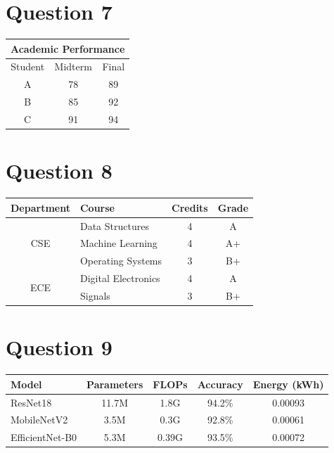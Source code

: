 \documentclass[12pt,a4paper]{article}
\begin{document}
	\section*{Question 7}
	
	\begin{center}
		\begin{tabular}{|c|c|c|}
			\hline
			\multicolumn{3}{|c|}{\textbf{Academic Performance}} \\
			\hline
			Student & Midterm & Final \\
			\hline
			A & 78 & 89 \\
			\hline
			B & 85 & 92 \\
			\hline
			C & 91 & 94 \\
			\hline
		\end{tabular}
	\end{center}
	
	\section*{Question 8}
	
	\begin{center}
		\begin{tabular}{|c|l|c|c|}
			\hline
			\textbf{Department} &
			\textbf{Course} &
			\textbf{Credits} &
			\textbf{Grade} \\
			\hline
			\multirow{3}{*}{CSE}
			& Data Structures     & 4 & A  \\
			& Machine Learning    & 4 & A+ \\
			& Operating Systems   & 3 & B+ \\
			\hline
			\multirow{2}{*}{ECE}
			& Digital Electronics & 4 & A  \\
			& Signals             & 3 & B+ \\
			\hline
		\end{tabular}
	\end{center}
	
	\section*{Question 9}
	
	\begin{center}
		
		\begin{tabular}{|l|c|c|c|c|}
			\hline
			\rowcolor{blue!60}
			\color{white}\textbf{Model} &
			\color{white}\textbf{Parameters} &
			\color{white}\textbf{FLOPs} &
			\color{white}\textbf{Accuracy} &
			\color{white}\textbf{Energy (kWh)} \\
			\hline
			ResNet18       & 11.7M & 1.8G  & 94.2\% & 0.00093 \\
			\hline
			MobileNetV2    & 3.5M  & 0.3G  & 92.8\% & 0.00061 \\
			\hline
			EfficientNet-B0 & 5.3M & 0.39G & 93.5\% & 0.00072 \\
			\hline
		\end{tabular}
	\end{center}
	
\end{document}
